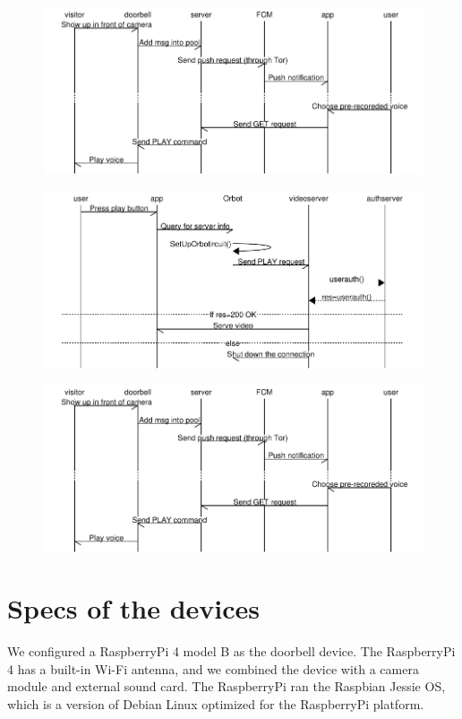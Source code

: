 \begin{figure}
	\includegraphics[width=\linewidth]{Sequence_diagram_push.pdf}
	\caption{}
	\label{fig:pushnotification}
\end{figure}
\begin{figure}
	\includegraphics[width=\linewidth]{Sequence_diagram_playvideo.pdf}
	\caption{}
	\label{fig:playvideo}
\end{figure}
\begin{figure}
	\includegraphics[width=\linewidth]{Sequence_diagram_push.pdf}
	\caption{}
	\label{fig:push}
\end{figure}

\section{Specs of the devices}
We configured a RaspberryPi 4 model B as the doorbell device. The RaspberryPi 4 has a built-in Wi-Fi antenna, and we combined the device with a camera module and external sound card. The RaspberryPi ran the Raspbian Jessie OS, which is a version of Debian Linux optimized for the RaspberryPi platform.


